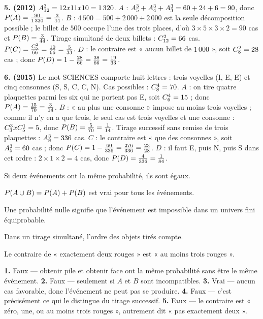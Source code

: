 \begin{corrige}[annales]
\textbf{5. (2012)} $\arrang{3}{12} = 12\times11\times10 = 1\,320$.
\checkmark
$A$ : $\arrang{3}{5}+\arrang{3}{4}+\arrang{3}{3} = 60+24+6 = 90$, donc
$\proba{A} = \frac{90}{1\,320} = \frac{3}{44}$.
$B$ : $4\,500 = 500+2\,000+2\,000$ est la seule décomposition possible ; le
billet de $500$ occupe l'une des trois places, d'où
$3\times5\times3\times2 = 90$ cas et $\proba{B} = \frac{3}{44}$.
Tirage simultané de deux billets : $\combi{2}{12} = 66$ cas.
$\proba{C} = \frac{\combi{2}{5}}{66} = \frac{10}{66} = \frac{5}{33}$.
$D$ : le contraire est « aucun billet de $1\,000$ », soit
$\combi{2}{8} = 28$ cas ; donc
$\proba{D} = 1-\frac{28}{66} = \frac{38}{66} = \frac{19}{33}$.

\textbf{6. (2015)} Le mot SCIENCES comporte huit lettres : trois voyelles
(I, E, E) et cinq consonnes (S, S, C, C, N). Cas possibles :
$\combi{4}{8} = 70$.
$A$ : on tire quatre plaquettes parmi les six qui ne portent pas E, soit
$\combi{4}{6} = 15$ ; donc $\proba{A} = \frac{15}{70} = \frac{3}{14}$.
$B$ : « au plus une consonne » impose au moins trois voyelles ; comme il n'y
en a que trois, le seul cas est trois voyelles et une consonne :
$\combi{3}{3}\times\combi{1}{5} = 5$, donc
$\proba{B} = \frac{5}{70} = \frac{1}{14}$.
Tirage successif sans remise de trois plaquettes :
$\arrang{3}{8} = 336$ cas.
$C$ : le contraire est « que des consonnes », soit $\arrang{3}{5} = 60$
cas ; donc $\proba{C} = 1-\frac{60}{336} = \frac{276}{336} = \frac{23}{28}$.
$D$ : il faut E, puis N, puis S dans cet ordre : $2\times1\times2 = 4$ cas,
donc $\proba{D} = \frac{4}{336} = \frac{1}{84}$.
\end{corrige}

\begin{vraifaux}
\exo Si deux événements ont la même probabilité, ils sont égaux.

\exo $\proba{A \cup B} = \proba{A}+\proba{B}$ est vrai pour tous les
événements.

\exo Une probabilité nulle signifie que l'événement est impossible dans un
univers fini équiprobable.

\exo Dans un tirage simultané, l'ordre des objets tirés compte.

\exo Le contraire de « exactement deux rouges » est « au moins trois
rouges ».
\end{vraifaux}

\begin{corrige}
\textbf{1.} Faux — obtenir pile et obtenir face ont la même probabilité sans
être le même événement.
\textbf{2.} Faux — seulement si $A$ et $B$ sont incompatibles.
\textbf{3.} Vrai — aucun cas favorable, donc l'événement ne peut pas se
produire.
\textbf{4.} Faux — c'est précisément ce qui le distingue du tirage
successif.
\textbf{5.} Faux — le contraire est « zéro, une, ou au moins trois
rouges », autrement dit « pas exactement deux ».
\end{corrige}

